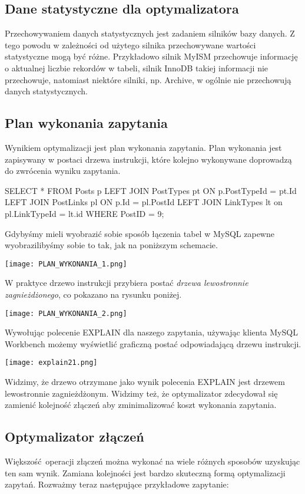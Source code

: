 \subsection{Dane statystyczne dla optymalizatora}
Przechowywaniem danych statystycznych jest zadaniem silników bazy danych. Z tego powodu w zależności od użytego silnika przechowywane wartości statystyczne mogą być różne. Przykładowo silnik MyISM przechowuje informację o aktualnej liczbie rekordów w tabeli, silnik InnoDB takiej informacji nie przechowuje, natomiast niektóre silniki, np. Archive, w ogólnie nie przechowują danych statystycznych.

\subsection{Plan wykonania zapytania}
Wynikiem optymalizacji jest plan wykonania zapytania. Plan wykonania jest zapisywany w postaci drzewa instrukcji, które kolejno wykonywane doprowadzą do zwrócenia wyniku zapytania.
\begin{spverbatim}
	SELECT * FROM Posts p LEFT JOIN PostTypes pt ON p.PostTypeId = pt.Id LEFT JOIN PostLinks pl ON p.Id = pl.PostId LEFT JOIN LinkTypes lt on pl.LinkTypeId = lt.id WHERE PostID = 9;
\end{spverbatim}
Gdybyśmy mieli wyobrazić sobie sposób łączenia tabel w MySQL zapewne wyobrazilibyśmy sobie to tak, jak na poniższym schemacie.
 \begin{center}
 	\texttt{[image: PLAN\_WYKONANIA\_1.png]} 
 \end{center}
W praktyce drzewo instrukcji przybiera postać \textit{drzewa lewostronnie zagnieżdżonego}, co pokazano na rysunku poniżej.
\begin{center}
	\texttt{[image: PLAN\_WYKONANIA\_2.png]} 
\end{center}
Wywołując polecenie EXPLAIN dla naszego zapytania, używając klienta MySQL Workbench możemy wyświetlić graficzną postać odpowiadającą drzewu instrukcji.
\begin{center}
	\texttt{[image: explain21.png]} 
\end{center}
Widzimy, że drzewo otrzymane jako wynik polecenia EXPLAIN jest drzewem lewostronnie zagnieżdżonym. Widzimy też, że optymalizator zdecydował się zamienić kolejność złączeń aby zminimalizować koszt wykonania zapytania.

\subsection{Optymalizator złączeń}
Większość operacji złączeń można wykonać na wiele różnych sposobów uzyskując ten sam wynik. Zamiana kolejności jest bardzo skuteczną formą optymalizacji zapytań. Rozważmy teraz następujące przykładowe zapytanie:

